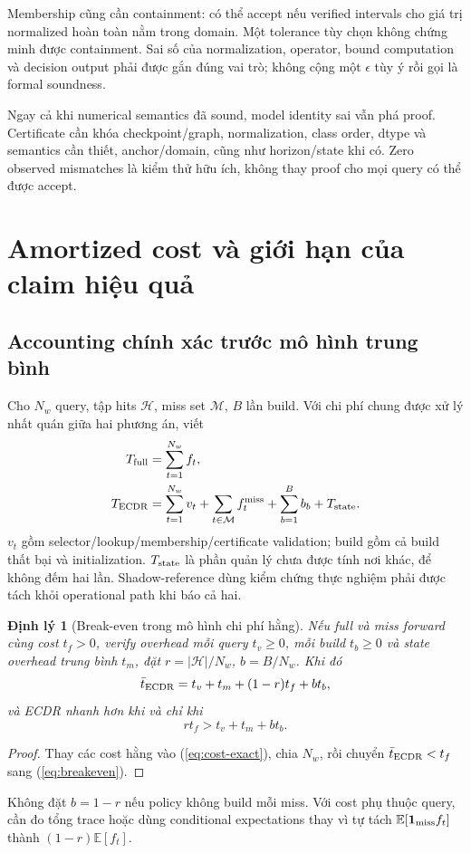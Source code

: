 \documentclass[11pt,a4paper]{article}
\newcommand{\ind}{\mathbf 1}
\newcommand{\E}{\mathbb E}
\newtheorem{theorem}[definition]{Định lý}
\theoremstyle{remark}
\begin{document}
Membership cũng cần containment: có thể accept nếu verified intervals cho
giá trị normalized hoàn toàn nằm trong domain. Một tolerance tùy chọn
không chứng minh được containment. Sai số của normalization, operator,
bound computation và decision output phải được gắn đúng vai trò; không
cộng một $\epsilon$ tùy ý rồi gọi là formal soundness.

Ngay cả khi numerical semantics đã sound, model identity sai vẫn phá proof.
Certificate cần khóa checkpoint/graph, normalization, class order, dtype
và semantics cần thiết, anchor/domain, cũng như horizon/state khi có.
Zero observed mismatches là kiểm thử hữu ích, không thay proof cho mọi
query có thể được accept.

\section{Amortized cost và giới hạn của claim hiệu quả}
\subsection{Accounting chính xác trước mô hình trung bình}
Cho $N_w$ query, tập hits $\mathcal H$, miss set $\mathcal M$, $B$ lần build.
Với chi phí chung được xử lý nhất quán giữa hai phương án, viết
\begin{align}
 T_{\rm full}&=\sum_{t=1}^{N_w} f_t,\\
 T_{\rm ECDR}&=\sum_{t=1}^{N_w}v_t+
 \sum_{t\in\mathcal M}f_t^{\rm miss}+\sum_{b=1}^B b_b+T_{\rm state}.
 \label{eq:cost-exact}
\end{align}
$v_t$ gồm selector/lookup/membership/certificate validation; build gồm
cả build thất bại và initialization. $T_{\rm state}$ là phần quản lý chưa
được tính nơi khác, để không đếm hai lần. Shadow-reference dùng kiểm chứng
thực nghiệm phải được tách khỏi operational path khi báo cả hai.

\begin{theorem}[Break-even trong mô hình chi phí hằng]\label{th:cost}
Nếu full và miss forward cùng cost $t_f>0$, verify overhead mỗi query
$t_v\ge0$, mỗi build $t_b\ge0$ và state overhead trung bình $t_m$, đặt
$r=|\mathcal H|/N_w$, $b=B/N_w$. Khi đó
\begin{equation}
 \bar t_{\rm ECDR}=t_v+t_m+(1-r)t_f+bt_b,
\end{equation}
và ECDR nhanh hơn khi và chỉ khi
\begin{equation}
 r t_f>t_v+t_m+bt_b.
 \label{eq:breakeven}
\end{equation}
\end{theorem}
\begin{proof}
Thay các cost hằng vào (\ref{eq:cost-exact}), chia $N_w$, rồi chuyển
$\bar t_{\rm ECDR}<t_f$ sang (\ref{eq:breakeven}).
\end{proof}
Không đặt $b=1-r$ nếu policy không build mỗi miss. Với cost phụ thuộc query,
cần đo tổng trace hoặc dùng conditional expectations thay vì tự tách
$\E[\ind_{\rm miss} f_t]$ thành $(1-r)\E[f_t]$.
\end{document}
